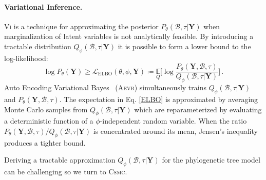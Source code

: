 \documentclass[accepted]{uai2021} %
\theoremstyle{definition}
\begin{document}
\paragraph{Variational Inference.}
\textsc{Vi} is a technique for approximating the posterior $P_\theta(\mathcal{B},\tau | \mathbf{Y})$ %
when marginalization of latent variables is not analytically feasible. By introducing a tractable distribution $Q_\phi(\mathcal{B},\tau|\mathbf{Y})$ it is possible to form a lower bound to the log-likelihood:
\begin{equation}
\log P_\theta(\mathbf{Y}) \geq \mathcal{L}_{\text{ELBO}}(\theta,\phi,\mathbf{Y}) \coloneqq \underset{Q}{\mathbb{E}}\Bigg[\log \frac{P_\theta(\mathbf{Y}, \mathcal{B},\tau)} {Q_\phi(\mathcal{B},\tau|\mathbf{Y})}\Bigg] \,. \label{ELBO}
\end{equation}
Auto Encoding Variational Bayes~\citep{kingma2013autoencoding} (\textsc{Aevb}) simultaneously %
trains
$Q_\phi(\mathcal{B},\tau|\mathbf{Y})$ and $P_\theta(\mathbf{Y}, \mathcal{B},\tau)$. 
The expectation in Eq. \ref{ELBO} is approximated by averaging Monte Carlo samples from $Q_\phi(\mathcal{B},\tau|\mathbf{Y})$ which are reparameterized by evaluating a deterministic function of a $\phi$-independent random variable. When the ratio $P_\theta(\mathbf{Y}, \mathcal{B},\tau)/Q_\phi(\mathcal{B},\tau|\mathbf{Y})$ is concentrated around its mean, Jensen's inequality produces a tighter bound.

Deriving a tractable approximation $Q_\phi(\mathcal{B},\tau|\mathbf{Y})$ for the phylogenetic tree model can be challenging so we turn to \textsc{Csmc}.
\end{document}
